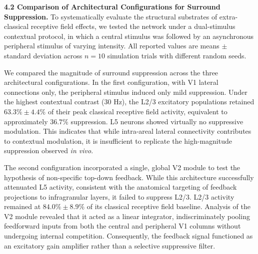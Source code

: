 \label{sec:results_comparison}
\textbf{4.2 Comparison of Architectural Configurations for Surround Suppression.} To systematically evaluate the structural substrates of extra-classical receptive field effects, we tested the network under a dual-stimulus contextual protocol, in which a central stimulus was followed by an asynchronous peripheral stimulus of varying intensity. All reported values are means $\pm$ standard deviation across $n = 10$ simulation trials with different random seeds.

We compared the magnitude of surround suppression across the three architectural configurations. In the first configuration, with V1 lateral connections only, the peripheral stimulus induced only mild suppression. Under the highest contextual contrast ($30$ Hz), the L2/3 excitatory populations retained $63.3\% \pm 4.4\%$ of their peak classical receptive field activity, equivalent to approximately $36.7\%$ suppression. L5 neurons showed virtually no suppressive modulation. This indicates that while intra-areal lateral connectivity contributes to contextual modulation, it is insufficient to replicate the high-magnitude suppression observed \textit{in vivo}.

The second configuration incorporated a single, global V2 module to test the hypothesis of non-specific top-down feedback. While this architecture successfully attenuated L5 activity, consistent with the anatomical targeting of feedback projections to infragranular layers, it failed to suppress L2/3. L2/3 activity remained at $84.0\% \pm 8.9\%$ of its classical receptive field baseline. Analysis of the V2 module revealed that it acted as a linear integrator, indiscriminately pooling feedforward inputs from both the central and peripheral V1 columns without undergoing internal competition. Consequently, the feedback signal functioned as an excitatory gain amplifier rather than a selective suppressive filter.

